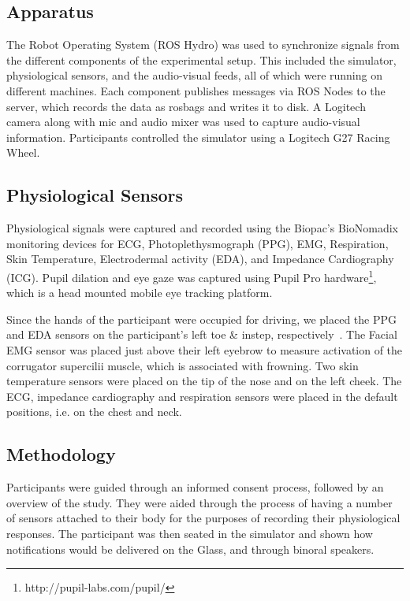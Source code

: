 
\subsection{Apparatus}
The Robot Operating System (ROS Hydro) was used to synchronize signals from the different components of the experimental setup. This included the simulator, physiological sensors, and the audio-visual feeds, all of which were running on different machines. Each component publishes messages via ROS Nodes to the server, which records the data as rosbags and writes it to disk. A Logitech camera along with mic and audio mixer was used to capture audio-visual information. Participants controlled the simulator using a Logitech G27 Racing Wheel.

\subsection{Physiological Sensors}
Physiological signals were captured and recorded using the Biopac's BioNomadix monitoring devices for ECG, Photoplethysmograph (PPG), EMG, Respiration, Skin Temperature, Electrodermal activity (EDA), and Impedance Cardiography (ICG). Pupil dilation and eye gaze was captured using Pupil Pro hardware\footnote{http://pupil-labs.com/pupil/}, which is a head mounted mobile eye tracking platform.

Since the hands of the participant were occupied for driving, we placed the PPG and EDA sensors on the participant's left toe \& instep, respectively~\cite{vanDooren2012}. The Facial EMG sensor was placed just above their left eyebrow to measure activation of the corrugator supercilii muscle, which is associated with frowning. Two skin temperature sensors were placed on the tip of the nose and on the left cheek. The ECG, impedance cardiography and respiration sensors were placed in the default positions, i.e. on the chest and neck. 

\subsection{Methodology}
Participants  were guided through an informed consent process, followed by an overview of the study. They were aided through the process of having a number of sensors attached to their body for the purposes of recording their physiological responses. The participant was then seated in the simulator and shown how notifications would be delivered on the Glass, and through binoral speakers. 

